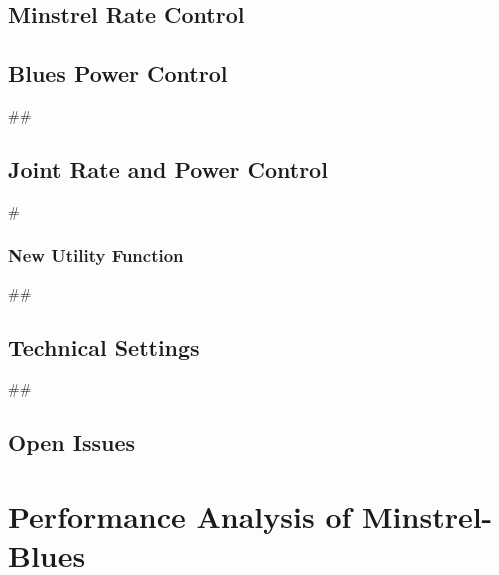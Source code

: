 \documentclass{sig-alternate}
\begin{document}
		\subsection{Minstrel Rate Control}
		\label{s:minstrel-rate}

		\subsection{Blues Power Control}
		\label{s:minstrel-blues}

		##
		\subsection{Joint Rate and Power Control}
		\label{s:joint-control}

			#
			\subsubsection{New Utility Function}
			\label{s:utility-function}

		##
		\subsection{Technical Settings}
		\label{s:technical-settings}

		##
		\subsection{Open Issues}
		\label{s:open-issues}






	\section{Performance Analysis of Minstrel-Blues}
	\label{s:performance-analysis}
\end{document}
